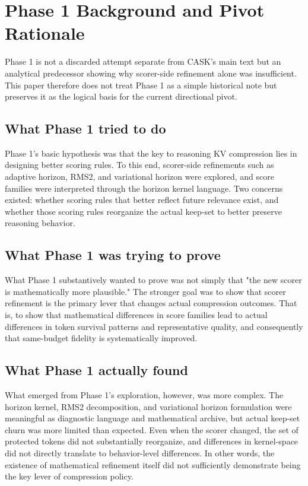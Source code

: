 \section{Phase 1 Background and Pivot Rationale}


Phase 1 is not a discarded attempt separate from CASK's main text but an analytical predecessor showing why scorer-side refinement alone was insufficient. This paper therefore does not treat Phase 1 as a simple historical note but preserves it as the logical basis for the current directional pivot.


\subsection{What Phase 1 tried to do}


Phase 1's basic hypothesis was that the key to reasoning KV compression lies in designing better scoring rules. To this end, scorer-side refinements such as adaptive horizon, RMS2, and variational horizon were explored, and score families were interpreted through the horizon kernel language. Two concerns existed: whether scoring rules that better reflect future relevance exist, and whether those scoring rules reorganize the actual keep-set to better preserve reasoning behavior.


\subsection{What Phase 1 was trying to prove}


What Phase 1 substantively wanted to prove was not simply that "the new scorer is mathematically more plausible." The stronger goal was to show that scorer refinement is the primary lever that changes actual compression outcomes. That is, to show that mathematical differences in score families lead to actual differences in token survival patterns and representative quality, and consequently that same-budget fidelity is systematically improved.


\subsection{What Phase 1 actually found}


What emerged from Phase 1's exploration, however, was more complex. The horizon kernel, RMS2 decomposition, and variational horizon formulation were meaningful as diagnostic language and mathematical archive, but actual keep-set churn was more limited than expected. Even when the scorer changed, the set of protected tokens did not substantially reorganize, and differences in kernel-space did not directly translate to behavior-level differences. In other words, the existence of mathematical refinement itself did not sufficiently demonstrate being the key lever of compression policy.


